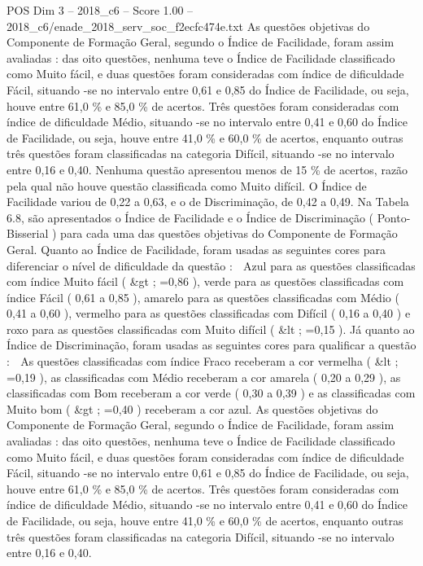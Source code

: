 \begin{textsample}{POS Dim 3 – 2018\_c6 – Score 1.00 – 2018\_c6/enade\_2018\_serv\_soc\_f2ecfc474e.txt}
As questões objetivas do Componente de Formação Geral, segundo o Índice de Facilidade, foram assim avaliadas : das oito questões, nenhuma teve o Índice de Facilidade classificado como Muito fácil, e duas questões foram consideradas com índice de dificuldade Fácil, situando -se no intervalo entre 0,61 e 0,85 do Índice de Facilidade, ou seja, houve entre 61,0 \% e 85,0 \% de acertos.
Três questões foram consideradas com índice de dificuldade Médio, situando -se no intervalo entre 0,41 e 0,60 do Índice de Facilidade, ou seja, houve entre 41,0 \% e 60,0 \% de acertos, enquanto outras três questões foram classificadas na categoria Difícil, situando -se no intervalo entre 0,16 e 0,40.
Nenhuma questão apresentou menos de 15 \% de acertos, razão pela qual não houve questão classificada como Muito difícil.
O Índice de Facilidade variou de 0,22 a 0,63, e o de Discriminação, de 0,42 a 0,49.
Na Tabela 6.8, são apresentados o Índice de Facilidade e o Índice de Discriminação ( Ponto-Bisserial ) para cada uma das questões objetivas do Componente de Formação Geral.
Quanto ao Índice de Facilidade, foram usadas as seguintes cores para diferenciar o nível de dificuldade da questão :  Azul para as questões classificadas com índice Muito fácil ( \&gt ; =0,86 ), verde para as questões classificadas com índice Fácil ( 0,61 a 0,85 ), amarelo para as questões classificadas com Médio ( 0,41 a 0,60 ), vermelho para as questões classificadas com Difícil ( 0,16 a 0,40 ) e roxo para as questões classificadas com Muito difícil ( \&lt ; =0,15 ).
Já quanto ao Índice de Discriminação, foram usadas as seguintes cores para qualificar a questão :  As questões classificadas com índice Fraco receberam a cor vermelha ( \&lt ; =0,19 ), as classificadas com Médio receberam a cor amarela ( 0,20 a 0,29 ), as classificadas com Bom receberam a cor verde ( 0,30 a 0,39 ) e as classificadas com Muito bom ( \&gt ; =0,40 ) receberam a cor azul.
As questões objetivas do Componente de Formação Geral, segundo o Índice de Facilidade, foram assim avaliadas : das oito questões, nenhuma teve o Índice de Facilidade classificado como Muito fácil, e duas questões foram consideradas com índice de dificuldade Fácil, situando -se no intervalo entre 0,61 e 0,85 do Índice de Facilidade, ou seja, houve entre 61,0 \% e 85,0 \% de acertos.
Três questões foram consideradas com índice de dificuldade Médio, situando -se no intervalo entre 0,41 e 0,60 do Índice de Facilidade, ou seja, houve entre 41,0 \% e 60,0 \% de acertos, enquanto outras três questões foram classificadas na categoria Difícil, situando -se no intervalo entre 0,16 e 0,40.

\end{textsample}
